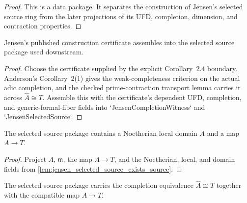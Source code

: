 \begin{proof}
  This is a data package.  It separates the construction of Jensen's selected
  source ring from the later projections of its UFD, completion, dimension, and
  contraction properties.
\end{proof}

\begin{lemma}
  \label{lem:jensen_selected_source_exists_source}
  Jensen's published construction certificate assembles into the selected
  source package used downstream.
\end{lemma}

\begin{proof}
  Choose the certificate supplied by the explicit Corollary~2.4 boundary.
  Anderson's Corollary~2(1) gives the weak-completeness criterion on the actual
  adic completion, and the checked prime-contraction transport lemma carries it
  across \(\widehat A\cong T\).  Assemble this with the certificate's dependent
  UFD, completion, and generic-formal-fiber fields into
  `JensenCompletionWitness` and `JensenSelectedSource`.
\end{proof}

\begin{lemma}
  \label{lem:jensen_selected_ring_exists_source}
  The selected source package contains a Noetherian local domain \(A\) and a map
  \(A\to T\).
\end{lemma}

\begin{proof}
  Project \(A\), \(\mathfrak m\), the map \(A\to T\), and the Noetherian,
  local, and domain fields from \cref{lem:jensen_selected_source_exists_source}.
\end{proof}

\begin{lemma}
  \label{lem:jensen_selected_ring_completion_equiv_source}
  The selected source package carries the completion equivalence
  \(\widehat A\cong T\) together with the compatible map \(A\to T\).
\end{lemma}

